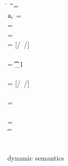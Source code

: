 \documentclass[runnningheads]{tex/llncs}
\begin{document}
%
\begin{figure}[!h]
\noindent\hrulefill


\medskip
\small

\begin{minipage}{\textwidth}
\small        
\begin{tabbing}
  \K\HS \New{} \HS\= \s~ \HS \=\Red\HS \= \K \HS\= \ap \HS\= \sp\HS \= \WHERE\HS\= \fresh\ap \HS\HS\HS\HS\HS\HS\HS\=  \sp = {\Map{}}
\\
\K\HS \FReadR\a{\f[i]} \> \s           \>\Red\>     \K \>$\a[i]$ \> \s  \> \WHERE \>\App\s\a=\obj{}
\\
\K\HS {\FWriteR\a{\f[i]}\ap} \> \s     \>\Red\>     \K \> \ap \> \sp \>  \WHERE \>\App\s\a=\obj{} \HS  \\ \> \> \> \> \> \> \> \sp = \Map{}
\\
\K\HS{\KCall\a\m\ap\t\tp} \> \s      \>\Red\>     \K \>  \ep \> \s \> \WHERE\> \ep = {[\a/\this~{\ap/\x}]\e} \HS \\ \> \> \> \> \> \> \> \Mdef\m{}\e\In \App\K\C  \\ \> \> \> \> \> \> \>  \App\s\a=\obj{} \> \StrSub {\emptyset}\K\t {\t_{1}} \\ 
\> \> \> \> \> \> \> \StrSub {\emptyset} \tp
\\
 \K\HS {\DynCall\a\m\ap}\> \s        \>\Red\>    \K \> \ep \> \s \>  \WHERE\> \ep = {[\a/\this~{\ap/\x}]\e}\HS \\ \> \> \> \> \> \> \> \Mdef\m\x\any\any\e \In \App\K\C \\ \> \> \> \> \> \> \> \App\s\a=\obj{} 
\\
 \K\HS {\SubCast \any\a} \> \s       \>\Red\>   \K \> \a \> \s
\\
 \K\HS {\SubCast \D\a} \> \s        \>\Red\>    \K \> \a \> \s \>  \WHERE\> \StrSub {\emptyset}\K\C \D \>\App\s\a=\obj{} 
\\
 \K\HS {\BehCast \t\a} \> \s         \>\Red\>   \Kp \> \ap \> \sp \> \WHERE\> \behcast \a\t\s\K \Kp\ap\sp    
\\
\K \HS \EM{\EE[\e]} \> \s            \>\Red\>   \Kp \> \EM{\EE[\ep]} \> \sp \> \WHERE \> \K~\e~\s \Red~\Kp~\ep~\sp
\end{tabbing}
\end{minipage}

\medskip

\hrulefill
\caption{\kafka dynamic semantics}\label{fig:semantics}
\end{figure}
\end{document}
